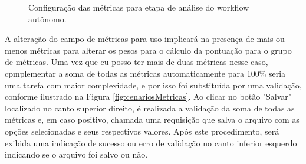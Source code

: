 \documentclass[portugues]{ic-tese}
\begin{document}
\begin{figure}[H]
    \centering
    \caption{Configuração das métricas para etapa de análise do workflow autônomo.}
    \label{fig:configMetricas}
\end{figure}

A alteração do campo de métricas para uso implicará na presença de mais ou menos métricas para alterar os pesos para o cálculo da pontuação para o grupo de métricas. Uma vez que eu posso ter mais de duas métricas nesse caso, cpmplementar a soma de todas as métricas automaticamente para 100\% seria uma tarefa com maior complexidade, e por isso foi substituída por uma validação, conforme ilustrado na Figura \ref{fig:cenariosMetricas}. Ao clicar no botão "Salvar" localizado no canto superior direito, é realizada a validação da soma de todas as métricas e, em caso positivo, chamada uma requisição que salva o arquivo com as opções selecionadas e seus respectivos valores. Após este procedimento, será exibida uma indicação de sucesso ou erro de validação no canto inferior esquerdo indicando se o arquivo foi salvo ou não.
\end{document}
